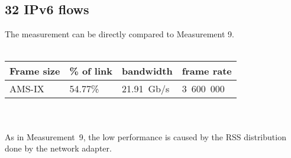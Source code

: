 
\subsection{32 IPv6 flows}
The measurement can be directly compared to Measurement 9.
\\
\\
\begin{tabular}{ | l | l | l | l | }
\hline
Frame size & \% of link & bandwidth & frame rate \\
\hline
AMS-IX & 54.77\% & 21.91~Gb/s & 3~600~000 \\
\hline
\end{tabular}
\\
\\
As in Measurement~9, the low performance is caused by the RSS distribution done by the network adapter.
